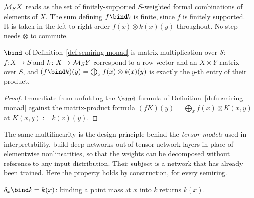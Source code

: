 $\mathcal M_{S}X$ reads as the set of finitely-supported $S$-weighted formal
combinations of elements of $X$. The sum defining $f \bind k$ is finite,
since $f$ is finitely supported. It is taken in the left-to-right order
$f(x)\otimes k(x)(y)$ throughout. No step needs $\otimes$ to commute.

\begin{lemma}
\label{lem:bind-matrix-mult}
\leanok
$\bind$ of Definition~\ref{def:semiring-monad} is matrix multiplication
over $S$: $f \colon X \to S$ and $k \colon X \to \mathcal M_{S}Y$ correspond to
a row vector and an $X \times Y$ matrix over $S$, and $(f \bind k)(y) =
\bigoplus_x f(x) \otimes k(x)(y)$ is exactly the $y$-th entry of their
product.
\end{lemma}

\begin{proof}
\leanok
Immediate from unfolding the $\bind$ formula of
Definition~\ref{def:semiring-monad} against the matrix-product formula
$(fK)(y) = \bigoplus_x f(x)\otimes K(x,y)$ at $K(x,y) := k(x)(y)$.
\end{proof}

The same multilinearity is the design principle behind the \emph{tensor
models} used in interpretability.
\citet{doomsCompositionalityUnlocksDeep24} build deep networks out of
tensor-network layers in place of elementwise nonlinearities, so that the
weights can be decomposed without reference to any input distribution.
Their subject is a network that has already been trained. Here the
property holds by construction, for every semiring.

\begin{lemma}
\label{lem:bind-left-unit}
\leanok
$\delta_x \bind k = k(x)$: binding a point mass at $x$ into $k$
returns $k(x)$.
\end{lemma}

